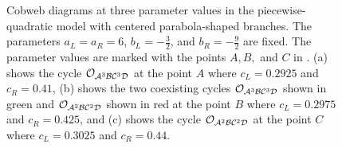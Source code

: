 \begin{figure}
	\centering
	\caption[Cobweb diagrams at three parameter values in the piecewise-quadratic model with centered parabola-shaped branches]{
		Cobweb diagrams at three parameter values in the piecewise-quadratic model with centered parabola-shaped branches.
		The parameters $a_L = a_R = 6$, $b_L = -\frac{3}{2}$, and $b_R = -\frac{9}{2}$ are fixed.
		The parameter values are marked with the points $A, B,$ and $C$ in .
		(a) shows the cycle $\mathcal{O}_{\mathcal{A}^3\mathcal{B}\mathcal{C}^3\mathcal{D}}$ at the point $A$ where $c_L = 0.2925$ and $c_R = 0.41$,
		(b) shows the two coexisting cycles $\mathcal{O}_{\mathcal{A}^3\mathcal{B}\mathcal{C}^3\mathcal{D}}$ shown in green and $\mathcal{O}_{\mathcal{A}^2\mathcal{B}\mathcal{C}^2\mathcal{D}}$ shown in red at the point $B$ where $c_L = 0.2975$ and $c_R = 0.425$,
		and (c) shows the cycle $\mathcal{O}_{\mathcal{A}^2\mathcal{B}\mathcal{C}^2\mathcal{D}}$ at the point $C$ where $c_L = 0.3025$ and $c_R = 0.44$.
	}
	\label{fig:setup.quad.even.cobwebs}
\end{figure}

